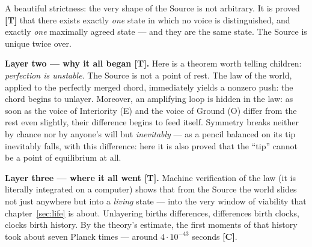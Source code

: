 \documentclass[11pt,letterpaper]{article}
\newcommand{\stT}{\textbf{[T]}\xspace}
\newcommand{\stC}{\textbf{[C]}\xspace}
\begin{document}
A beautiful strictness: the very shape of the Source is not
arbitrary. It is proved \stT{} that there exists exactly \emph{one}
state in which no voice is distinguished, and exactly \emph{one}
maximally agreed state --- and they are the same state. The Source is
unique twice over.

\textbf{Layer two --- why it all began \stT.} Here is a theorem worth
telling children: \emph{perfection is unstable}. The Source is not a
point of rest. The law of the world, applied to the perfectly merged
chord, immediately yields a nonzero push: the chord begins to
unlayer. Moreover, an amplifying loop is hidden in the law: as soon
as the voice of Interiority (E) and the voice of Ground (O) differ from
the rest even slightly, their difference begins to feed itself.
Symmetry breaks neither by chance nor by anyone's will but
\emph{inevitably} --- as a pencil balanced on its tip inevitably
falls, with this difference: here it is also proved that the ``tip''
cannot be a point of equilibrium at all.

\textbf{Layer three --- where it all went \stT.} Machine verification
of the law (it is literally integrated on a computer) shows that from
the Source the world slides not just anywhere but into a \emph{living}
state --- into the very window of viability that
chapter~\ref{sec:life} is about. Unlayering births differences,
differences birth clocks, clocks birth history. By the theory's
estimate, the first moments of that history took about seven Planck
times --- around $4\cdot10^{-43}$ seconds \stC.
\end{document}
